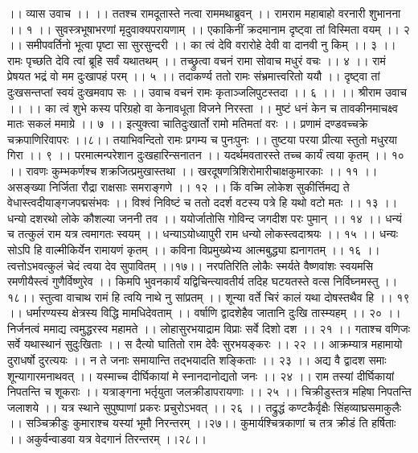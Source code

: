 ।। व्यास उवाच ।। ।।
ततश्च रामदूतास्ते नत्वा राममथाब्रुवन् ।।
रामराम महाबाहो वरनारी शुभानना ।। १ ।।
सुवस्त्रभूषाभरणां मृदुवाक्यपरायणाम् ।।
एकाकिनीं क्रदमानाम दृष्ट्वा तां विस्मिता वयम् ।। २ ।।
समीपवर्तिनो भूत्वा पृष्टा सा सुरसुन्दरी ।।
का त्वं देवि वरारोहे देवी वा दानवी नु किम् ।। ३ ।।
रामः पृच्छति देवि त्वां ब्रूहि सर्वं यथातथम् ।।
तच्छ्रुत्वा वचनं रामा सोवाच मधुरं वचः ।। ४ ।।
रामं प्रेषयत भद्रं वो मम दुःखापहं परम् ।। ५ ।।
तदाकर्ण्य ततो रामः संभ्रमात्त्वरितो ययौ ।।
दृष्ट्वा तां दुःखसन्तप्तां स्वयं दुःखमवाप सः ।।
उवाच वचनं रामः कृताञ्जलिपुटस्तदा ।। ६ ।।
।। श्रीराम उवाच ।। ।।
का त्वं शुभे कस्य परिग्रहो वा केनावधूता विजने निरस्ता ।।
मुष्टं धनं केन च तावकीनमाचक्ष्व मातः सकलं ममाग्रे ।। ७ ।।
इत्युक्त्वा चातिदुःखार्तो रामो मतिमतां वरः ।।
प्रणामं दण्डवच्चक्रे चक्रपाणिरिवापरः ।।८।।
तयाभिवन्दितो रामः प्रगम्य च पुनःपुनः ।।
तुष्टया परया प्रीत्या स्तुतो मधुरया गिरा ।। ९ ।।
परमात्मन्परेशान दुःखहारिन्सनातन ।।
यदर्थमवतारस्ते तच्च कार्यं त्वया कृतम् ।। १० ।।
रावणः कुम्भकर्णश्च शक्रजित्प्रमुखास्तथा ।।
खरदूषणत्रिशिरोमारीचाक्षकुमारकाः ।। ११ ।।
असङ्ख्या निर्जिता रौद्रा राक्षसाः समराङ्गणे ।। १२ ।।
किं वच्मि लोकेश सुकीर्त्तिमद्य ते वेधास्त्वदीयाङ्गजपद्मसंभवः ।।
विश्वं निविष्टं च ततो ददर्श वटस्य पत्रे हि यथो वटो मतः ।। १३ ।।
धन्यो दशरथो लोके कौशल्या जननी तव ।।
ययोर्जातोसि गोविन्द जगदीश परः पुमान् ।। १४ ।।
धन्यं च तत्कुलं राम यत्र त्वमागतः स्वयम् ।।
धन्याऽयोध्यापुरी राम धन्यो लोकस्त्वदाश्रयः ।। १५ ।।
धन्यः सोऽपि हि वाल्मीकिर्येन रामायणं कृतम् ।।
कविना विप्रमुख्येभ्य आत्मबुद्ध्या ह्यनागतम् ।। १६ ।।
त्वत्तोऽभवत्कुलं चेदं त्वया देव सुपावितम् ।।१७।।
नरपतिरिति लोकैः स्मर्यते वैष्णवांशः स्वयमसि रमणीयैस्त्वं गुणैर्विष्णुरेव ।।
किमपि भुवनकार्यं यद्विचिन्त्यावतीर्य तदिह घटयतस्ते वत्स निर्विघ्नमस्तु ।।१८।।
स्तुत्वा वाचाथ रामं हि त्वयि नाथे नु सांप्रतम् ।।
शून्या वर्ते चिरं कालं यथा दोषस्तथैव हि ।। १९ ।।
धर्मारण्यस्य क्षेत्रस्य विद्धि मामधिदेवताम् ।।
वर्षाणि द्वादशेहैव जातानि दुःखि तास्म्यहम् ।। २० ।।
निर्जनत्वं ममाद्य त्वमुद्धरस्व महामते ।।
लोहासुरभयाद्राम विप्राः सर्वे दिशो दश ।। २१ ।।
गताश्च वणिजः सर्वे यथास्थानं सुदुःखिताः ।।
स दैत्यो घातितो राम देवैः सुरभयङ्करः ।। २२ ।।
आक्रम्यात्र महामायो दुराधर्षो दुरत्ययः ।।
न ते जनाः समायान्ति तद्भयादति शङ्किताः ।। २३ ।।
अद्य वै द्वादश समाः शून्यागारमनाथवत् ।।
यस्माच्च दीर्घिकायां मे स्नानदानोद्यतो जनः ।। २४ ।।
राम तस्यां दीर्घिकायां निपतन्ति च शूकराः ।।
यत्राङ्गना भर्तृयुता जलक्रीडापरायणाः ।। २५ ।।
चिक्रीडुस्तत्र महिषा निपतन्ति जलाशये ।।
यत्र स्थाने सुपुष्पाणां प्रकरः प्रचुरोऽभवत् ।। २६ ।।
तद्रुद्धं कण्टकैर्वृक्षैः सिंहव्याघ्रसमाकुलैः ।।
सञ्चिक्रीडुः कुमाराश्च यस्यां भूमौ निरन्तरम् ।।२७।।
कुमार्यश्चित्रकाणां च तत्र क्रीडं ति हर्षिताः ।।
अकुर्वन्वाडवा यत्र वेदगानं तिरन्तरम् ।।२८।।
